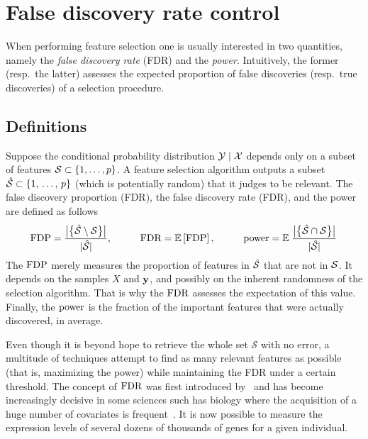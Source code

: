 \section{False discovery rate control}\label{sec:fdrc}

When performing feature selection one is usually interested in two quantities,
namely the \emph{false discovery rate} (FDR) and the \emph{power}.
Intuitively, the former (resp.\ the latter) assesses the expected proportion of false discoveries
(resp.\ true discoveries) of a selection procedure.

\subsection{Definitions}\label{subsec:fdr_def}

Suppose the conditional probability distribution $\mathcal{Y} \mid \mathcal{X}$ depends only on a subset of features
$\mathcal{S} \subset \left\{ 1, \dots, p \right\}$.
A feature selection algorithm outputs a subset $\hat{\mathcal{S}} \subset \left\{ 1,\, \dots,\, p \right\}$ (which is potentially random)
that it judges to be relevant.
The false discovery proportion (FDR), the false discovery rate (FDR), and the power are defined as follows
\begin{equation}\label{eq:fdr_def}
    \text{FDP} = \frac
        {\big\lvert \big\{ \hat{\mathcal{S}} \setminus \mathcal{S} \big\} \big\rvert}
        {\lvert \hat{\mathcal{S}} \rvert}
    \text{,}\qquad\quad
    \text{FDR} = {\mathbb E}\left[\text{FDP}\right]
    \text{,}\qquad\quad
    \text{power} = {\mathbb E}\left.
        \frac
            {\big\lvert \big\{ \hat{\mathcal{S}} \cap \mathcal{S} \big\} \big\rvert}
            {\lvert\hat{\mathcal{S}}\rvert}
    \right.
\end{equation}
The $\text{FDP}$ merely measures the proportion of features in $\hat{\mathcal{S}}$ that are not in $\mathcal{S}$.
It depends on the samples $X$ and $\mathbf{y}$,
and possibly on the inherent randomness of the selection algorithm.
That is why the $\text{FDR}$ assesses the expectation of this value.
Finally, the $\text{power}$ is the fraction of the important features that were actually discovered, in average.

Even though it is beyond hope to retrieve the whole set $\mathcal{S}$ with no error,
a multitude of techniques attempt to find as many relevant features as possible
(that is, maximizing the power)
while maintaining the FDR under a certain threshold.
The concept of $\text{FDR}$ was first introduced by~\cite{bh} and has become increasingly decisive in some
sciences such has biology
where the acquisition of a huge number of covariates is frequent~\cite{statistical_inference_genome}.
It is now possible to measure the expression levels of several dozens of thousands of genes for a given individual.


